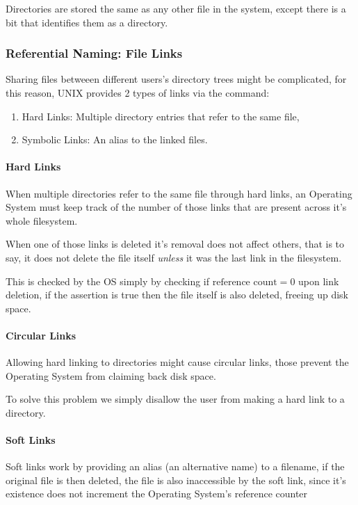 \documentclass[openright, twoside]{report}
\theoremstyle{definition}
\theoremstyle{example}
\begin{document}
Directories are stored the same as any other file in the system, except there 
is a bit that identifies them as a directory.

\subsubsection{Referential Naming: File Links}
Sharing files betweeen different users's directory trees might be 
complicated, for this reason, UNIX provides 2 types of links via the 
 command:

\begin{enumerate}
	\item Hard Links: Multiple directory entries that refer to the same file,
	\item Symbolic Links: An alias to the linked files.
\end{enumerate}

\paragraph{Hard Links}
When multiple directories refer to the same file through hard links, an Operating 
System must keep track of the number of those links that are present across it's 
whole filesystem.

When one of those links is deleted it's removal does not affect others, that is to say,
it does not delete the file itself \emph{unless} it was the last link in the filesystem.

This is checked by the OS simply by checking if $\text{reference count} = 0$ upon 
link deletion, if the assertion is true then the file itself is also deleted, freeing 
up disk space.

\paragraph{Circular Links}
Allowing hard linking to directories might cause circular links, those prevent 
the Operating System from claiming back disk space.

To solve this problem we simply disallow the user from making a hard link to a directory.

\paragraph{Soft Links}
Soft links work by providing an alias (an alternative name) to a filename, if 
the original file is then deleted, the file is also inaccessible by the 
soft link, since it's existence does not increment the Operating System's 
reference counter
\end{document}
